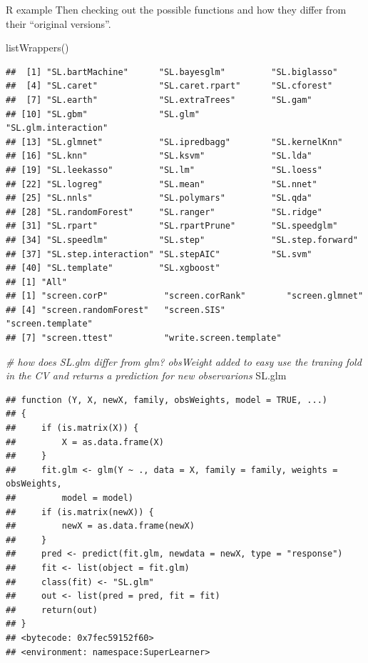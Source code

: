 \documentclass[
  ignorenonframetext,
]{beamer}
\newenvironment{Shaded}{\begin{snugshade}}{\end{snugshade}}
\newcommand{\CommentTok}[1]{\textcolor[rgb]{0.56,0.35,0.01}{\textit{#1}}}
\newcommand{\FunctionTok}[1]{\textcolor[rgb]{0.00,0.00,0.00}{#1}}
\newcommand{\NormalTok}[1]{#1}
\begin{document}
\begin{frame}[fragile]
\begin{block}{R example}
Then checking out the possible functions and how they differ from their
``original versions''.

\begin{Shaded}
\begin{Highlighting}[]
\FunctionTok{listWrappers}\NormalTok{()}
\end{Highlighting}
\end{Shaded}

\begin{verbatim}
##  [1] "SL.bartMachine"      "SL.bayesglm"         "SL.biglasso"        
##  [4] "SL.caret"            "SL.caret.rpart"      "SL.cforest"         
##  [7] "SL.earth"            "SL.extraTrees"       "SL.gam"             
## [10] "SL.gbm"              "SL.glm"              "SL.glm.interaction" 
## [13] "SL.glmnet"           "SL.ipredbagg"        "SL.kernelKnn"       
## [16] "SL.knn"              "SL.ksvm"             "SL.lda"             
## [19] "SL.leekasso"         "SL.lm"               "SL.loess"           
## [22] "SL.logreg"           "SL.mean"             "SL.nnet"            
## [25] "SL.nnls"             "SL.polymars"         "SL.qda"             
## [28] "SL.randomForest"     "SL.ranger"           "SL.ridge"           
## [31] "SL.rpart"            "SL.rpartPrune"       "SL.speedglm"        
## [34] "SL.speedlm"          "SL.step"             "SL.step.forward"    
## [37] "SL.step.interaction" "SL.stepAIC"          "SL.svm"             
## [40] "SL.template"         "SL.xgboost"         
## [1] "All"
## [1] "screen.corP"           "screen.corRank"        "screen.glmnet"        
## [4] "screen.randomForest"   "screen.SIS"            "screen.template"      
## [7] "screen.ttest"          "write.screen.template"
\end{verbatim}

\begin{Shaded}
\begin{Highlighting}[]
\CommentTok{\# how does SL.glm differ from glm? obsWeight added to easy use the traning fold in the CV and returns a prediction for new observarions}
\NormalTok{SL.glm}
\end{Highlighting}
\end{Shaded}

\begin{verbatim}
## function (Y, X, newX, family, obsWeights, model = TRUE, ...) 
## {
##     if (is.matrix(X)) {
##         X = as.data.frame(X)
##     }
##     fit.glm <- glm(Y ~ ., data = X, family = family, weights = obsWeights, 
##         model = model)
##     if (is.matrix(newX)) {
##         newX = as.data.frame(newX)
##     }
##     pred <- predict(fit.glm, newdata = newX, type = "response")
##     fit <- list(object = fit.glm)
##     class(fit) <- "SL.glm"
##     out <- list(pred = pred, fit = fit)
##     return(out)
## }
## <bytecode: 0x7fec59152f60>
## <environment: namespace:SuperLearner>
\end{verbatim}


\end{block}
\end{frame}
\end{document}
